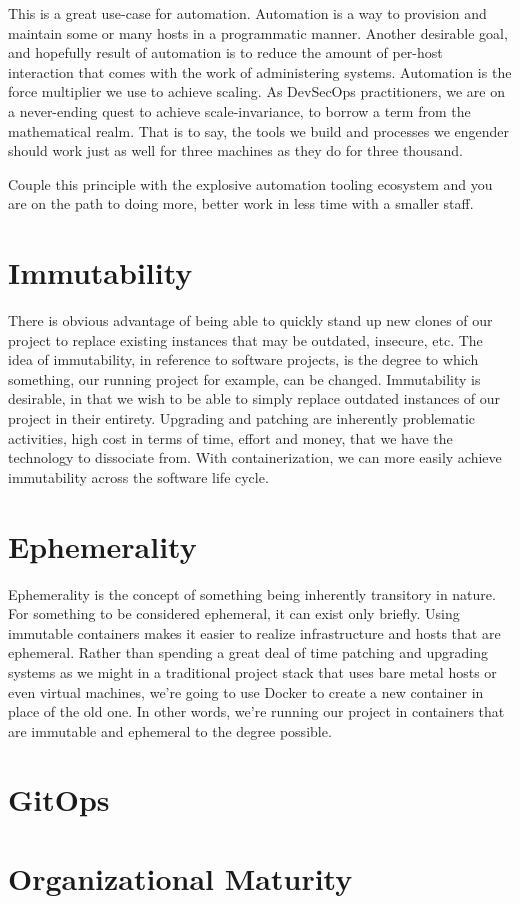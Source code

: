 \justify{}
This is a great use-case for automation. Automation is a way to provision and maintain some or many hosts
in a programmatic manner. Another desirable goal, and hopefully result of automation is to reduce the amount of
per-host interaction that comes with the work of administering systems. Automation is the force multiplier we use to achieve
scaling. As DevSecOps practitioners, we are on a never-ending quest to achieve
scale-invariance, to borrow a term from the mathematical realm. That is to say, the tools we
build and processes we engender should work just as well for three machines as they do for three thousand.

\justify{}
Couple this principle with the explosive automation tooling ecosystem and you are on the path to doing more, better work in
less time with a smaller staff.

\section{Immutability}

\justify{}
There is obvious advantage of being able to quickly stand up new clones of our project to replace existing instances that
may be outdated, insecure, etc. The idea of immutability, in reference to software projects, is the degree to which something, 
our running project for example, can be changed. Immutability is desirable, in that we wish to be able to
simply replace outdated instances of our project in their entirety. Upgrading and patching are inherently
problematic activities, high cost in terms of time, effort and money, that we have the technology to dissociate from. With
containerization, we can more easily achieve immutability across the software life cycle.

\section{Ephemerality}

\justify{}
Ephemerality is the concept of something being inherently transitory in nature. For something to be
considered ephemeral, it can exist only briefly. Using immutable containers makes it easier to realize
infrastructure and hosts that are ephemeral. Rather than spending a great deal of time patching and upgrading systems as
we might in a traditional project stack that uses bare metal hosts or even virtual machines, we're going to
use Docker to create a new container in place of the old one. In other words, we're running our project in containers that
are immutable and ephemeral to the degree possible.

\section{GitOps}

\section{Organizational Maturity}
